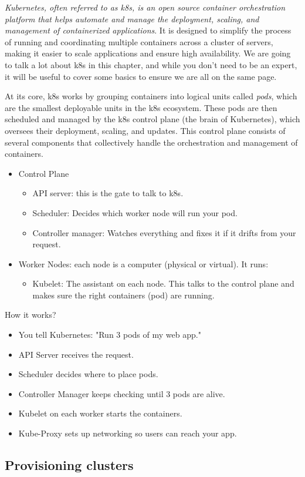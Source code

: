 \textit{Kubernetes, often referred to as k8s, is an open source container orchestration platform that helps automate and manage the deployment, scaling, and management of containerized applications}. It is designed to simplify the process of running and coordinating multiple containers across a cluster of servers, making it easier to scale applications and ensure high availability. We are going to talk a lot about k8s in this chapter, and while you don't need to be an expert, it will be useful to cover some basics to ensure we are all on the same page.

At its core, k8s works by grouping containers into logical units called \textit{pods}, which are the smallest deployable units in the k8s ecosystem. These pods are then scheduled and managed by the k8s control plane (\ie the brain of Kubernetes), which oversees their deployment, scaling, and updates. This control plane consists of several components that collectively handle the orchestration and management of containers. 

\begin{itemize}
	\item Control Plane
		\begin{itemize}
			\item API server: this is the gate to talk to k8s. 
			\item Scheduler: Decides which worker node will run your pod.
			\item Controller manager: Watches everything and fixes it if it drifts from your request.
		\end{itemize}
	\item Worker Nodes: each node is a computer (physical or virtual). It runs:
		\begin{itemize}
			\item Kubelet: The assistant on each node. This talks to the control plane and makes sure the right containers (\ie pod) are running. 
		\end{itemize}
\end{itemize}

How it works?
\begin{itemize}
	\item You tell Kubernetes: "Run 3 pods of my web app."
	\item API Server receives the request.
	\item Scheduler decides where to place pods.
	\item Controller Manager keeps checking until 3 pods are alive.
	\item Kubelet on each worker starts the containers.
	\item Kube-Proxy sets up networking so users can reach your app.
\end{itemize}

\subsection{Provisioning clusters}

